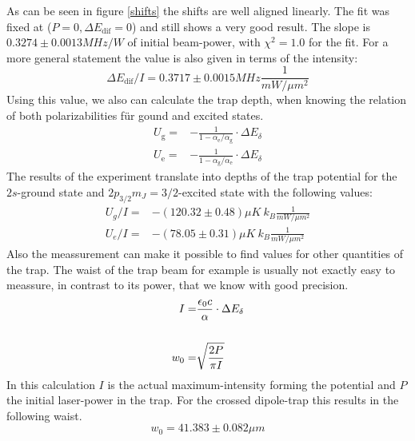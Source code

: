As can be seen in figure \ref{shifts} the shifts are well aligned linearly. The fit was fixed at ($P=0, \Delta E_\mathrm{dif}=0$) and still shows a very good result. The slope is $0.3274\pm 0.0013\unit{MHz/W}$ of initial beam-power, with $\chi^2=1.0$ for the fit. For a more general statement the value is also given in terms of the intensity:
\begin{equation}
\Delta E_\mathrm{dif}/I=0.3717\pm 0.0015\unit{MHz\frac{1}{mW/\mu m^2}}
\end{equation}
Using this value, we also can calculate the trap depth, when knowing the relation of both polarizabilities für gound and excited states.
\begin{align}
U_{\mathrm{g}}=&-\frac{1}{1-\alpha_{\mathrm{e}}/\alpha_{\mathrm{g}}}\cdot \Delta E_\delta\\
U_{\mathrm{e}}=&-\frac{1}{1-\alpha_{\mathrm{g}}/\alpha_{\mathrm{e}}}\cdot \Delta E_\delta
\end{align}
The results of the experiment translate into depths of the trap potential for the $2s$-ground state and $2p_{3/2} m_J=3/2$-excited state with the following values:
\begin{align}
U_g/I=&-(120.32\pm 0.48)\unit{\mu K\ k_B\frac{1}{mW/\mu m^2}}\\
U_e/I=&-(78.05\pm 0.31)\unit{\mu K\ k_B\frac{1}{mW/\mu m^2}}
\end{align}
Also the meassurement can make it possible to find values for other quantities of the trap. The waist of the trap beam for example is usually not exactly easy to meassure, in contrast to its power, that we know with good precision.
\begin{align}
I=&\frac{\epsilon_0 c}{\alpha}\cdot \Delta E_\delta\\\notag\\
w_0=&\sqrt{\frac{2P}{\pi I}}
\end{align}
In this calculation $I$ is the actual maximum-intensity forming the potential and $P$ the initial laser-power in the trap. For the crossed dipole-trap this results in the following waist.
\begin{equation}
w_0=41.383\pm 0.082\unit{\mu m}
\end{equation}

